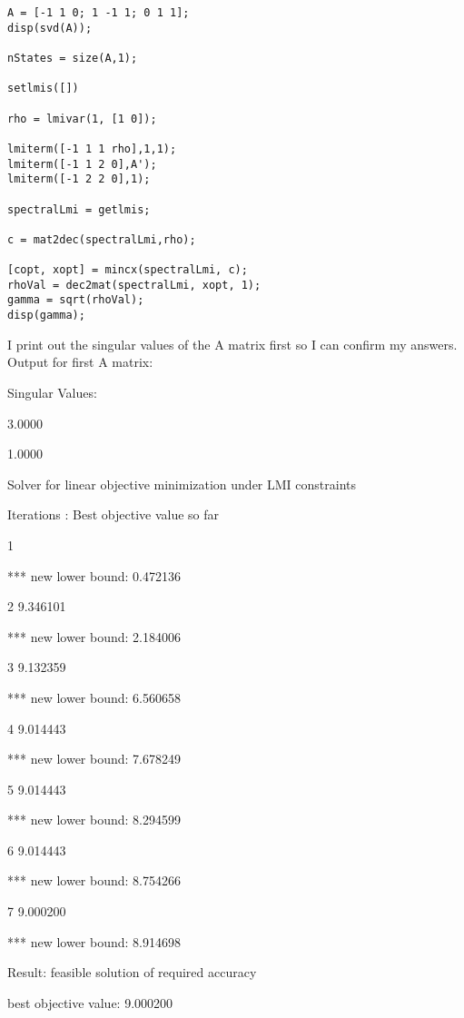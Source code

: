 \documentclass[12pt, letterpaper]{article}
\begin{document}
\begin{lstlisting}[style=matlabstyle]
% A = [2 -1; -1 2];
A = [-1 1 0; 1 -1 1; 0 1 1];
disp(svd(A));

nStates = size(A,1);

setlmis([])

rho = lmivar(1, [1 0]);

lmiterm([-1 1 1 rho],1,1);
lmiterm([-1 1 2 0],A');
lmiterm([-1 2 2 0],1);

spectralLmi = getlmis;

c = mat2dec(spectralLmi,rho);

[copt, xopt] = mincx(spectralLmi, c);
rhoVal = dec2mat(spectralLmi, xopt, 1);
gamma = sqrt(rhoVal);
disp(gamma);    
\end{lstlisting}

I print out the singular values of the A matrix first so I can confirm my answers.
Output for first A matrix:

Singular Values: 

3.0000

1.0000

Solver for linear objective minimization under LMI constraints 

Iterations   :    Best objective value so far 
 
     1

     ***                 new lower bound:     0.472136

     2                   9.346101

     ***                 new lower bound:     2.184006

     3                   9.132359

     ***                 new lower bound:     6.560658

     4                   9.014443

     ***                 new lower bound:     7.678249

     5                   9.014443

     ***                 new lower bound:     8.294599

     6                   9.014443

     ***                 new lower bound:     8.754266

     7                   9.000200

     ***                 new lower bound:     8.914698

 Result:  feasible solution of required accuracy

 best objective value:     9.000200
\end{document}
